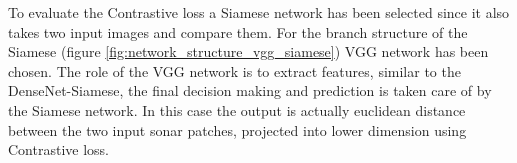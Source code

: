 To evaluate the Contrastive loss a Siamese network has been selected since it also takes two input images and compare them. For the branch structure of the Siamese (figure \ref{fig:network_structure_vgg_siamese}) VGG network 
has been chosen. The role of the VGG network \cite{VGG} is to extract features, similar to the DenseNet-Siamese, the final decision making and prediction is taken care of by the Siamese network. In this case the output is
actually euclidean distance between the two input sonar patches, projected into lower dimension using Contrastive loss.




